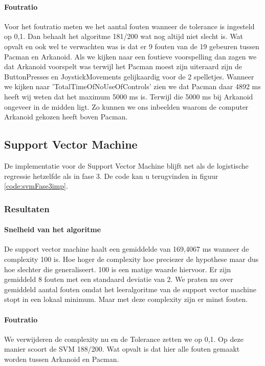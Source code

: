 \paragraph{Foutratio} 
Voor het foutratio meten we het aantal fouten wanneer de tolerance is ingesteld op 0,1. Dan behaalt het algoritme 181/200 wat nog altijd niet slecht is. Wat opvalt en ook wel te verwachten was is dat er 9 fouten van de 19 gebeuren tussen Pacman en Arkanoid. Als we kijken naar een foutieve voorspelling dan zagen we dat Arkanoid voorspelt was terwijl het Pacman moest zijn uiteraard zijn de ButtonPresses en JoystickMovements gelijkaardig voor de 2 spelletjes. Wanneer we kijken naar 'TotalTimeOfNoUseOfControls' zien we dat Pacman daar 4892 ms heeft wij weten dat het maximum 5000 ms is. Terwijl die 5000 ms bij Arkanoid ongeveer in de midden ligt. Zo kunnen we ons inbeelden waarom de computer Arkanoid gekozen heeft boven Pacman. 

\newpage
\subsection{Support Vector Machine}
\label{sec:supportvectormachineFase4}
De implementatie voor de Support Vector Machine blijft net als de logistische regressie hetzelfde als in fase 3. De code kan u terugvinden in figuur \ref{code:svmFase3imp}.

\subsubsection{Resultaten}
\paragraph{Snelheid van het algoritme} 
De support vector machine haalt een gemiddelde van 169,4067 ms wanneer de complexity 100 is. Hoe hoger de complexity hoe preciezer de hypothese maar dus hoe slechter die generaliseert. 100 is een matige waarde hiervoor. Er zijn gemiddeld 8 fouten met een standaard deviatie van 2. We praten nu over gemiddeld aantal fouten omdat het leeralgoritme van de support vector machine stopt in een lokaal minimum. Maar met deze complexity zijn er minst fouten. 


\paragraph{Foutratio}
We verwijderen de complexity nu en de Tolerance zetten we op 0,1. Op deze manier scoort de SVM 188/200. Wat opvalt is dat hier alle fouten gemaakt worden tussen Arkanoid en Pacman. 

